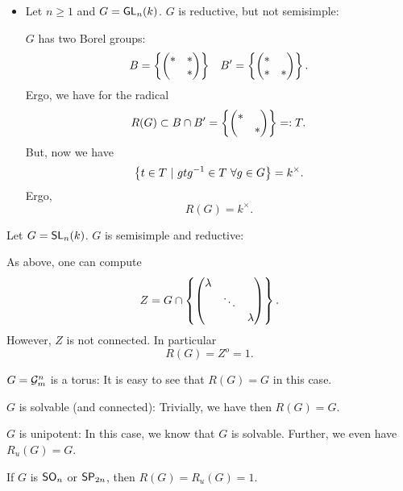 \begin{example}
	\begin{itemize}
		\item Let $n \geq 1$ and $G = \textsf{GL}_n(k)$. $G$ is reductive, but not semisimple:
		
		$G$ has two Borel groups:
		\begin{align*}
		B = \left\lbrace\left(\begin{matrix} * & *\\ & * \end{matrix}\right)\right\rbrace && B' = \left\lbrace\left(\begin{matrix} * & \\ * & * \end{matrix}\right)\right\rbrace.
		\end{align*}
		Ergo, we have for the radical
		\[ R(G) \subset B \cap B' = \left\lbrace\left(\begin{matrix} * & \\ & * \end{matrix}\right)\right\rbrace =: T. \]
		But, now we have
		\[ \left\lbrace t \in T ~ | ~ gtg^{-1} \in T ~ \forall g \in G\right\rbrace = k^\times. \]
		Ergo,
		\[ R(G) =  k^\times. \]
	\end{itemize}
\item Let $G = \textsf{SL}_n(k)$. $G$ is semisimple and reductive:

As above, one can compute
\[ Z = G \cap \left\lbrace\left(\begin{matrix}  \lambda & & \\
& \ddots & \\
& & \lambda \end{matrix}\right)\right\rbrace. \]
However, $Z$ is not connected. In particular
\[ R(G) = Z^o = 1. \]
\item $G = \mathcal{G}^n_m$ is a torus: It is easy to see that $R(G) = G$ in this case.
\item $G$ is solvable (and connected): Trivially, we have then $R(G) = G$.
\item $G$ is unipotent: In this case, we know that $G$ is solvable. Further, we even have $R_u(G) = G$.
\item If $G$ is $\textsf{SO}_n$ or $\textsf{SP}_{2n}$, then $R(G) = R_u(G) = 1$.
\end{example}